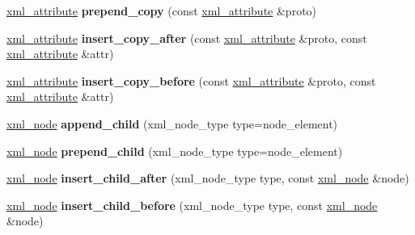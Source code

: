 \begin{DoxyCompactItemize}
\item 
\mbox{\label{classpugi_1_1xml__node_abd0f80e4d5bc938a27b50d37a0c7865b}} 
\hyperlink{classpugi_1_1xml__attribute}{xml\+\_\+attribute} {\bfseries prepend\+\_\+copy} (const \hyperlink{classpugi_1_1xml__attribute}{xml\+\_\+attribute} \&proto)
\item 
\mbox{\label{classpugi_1_1xml__node_ab5fd2ccada30141544b12c6ef554d8f4}} 
\hyperlink{classpugi_1_1xml__attribute}{xml\+\_\+attribute} {\bfseries insert\+\_\+copy\+\_\+after} (const \hyperlink{classpugi_1_1xml__attribute}{xml\+\_\+attribute} \&proto, const \hyperlink{classpugi_1_1xml__attribute}{xml\+\_\+attribute} \&attr)
\item 
\mbox{\label{classpugi_1_1xml__node_ac81f8aded4b53a9b8c98d131986cb535}} 
\hyperlink{classpugi_1_1xml__attribute}{xml\+\_\+attribute} {\bfseries insert\+\_\+copy\+\_\+before} (const \hyperlink{classpugi_1_1xml__attribute}{xml\+\_\+attribute} \&proto, const \hyperlink{classpugi_1_1xml__attribute}{xml\+\_\+attribute} \&attr)
\item 
\mbox{\label{classpugi_1_1xml__node_a190f4851bb4bc4bb61c89fffb663a9af}} 
\hyperlink{classpugi_1_1xml__node}{xml\+\_\+node} {\bfseries append\+\_\+child} (xml\+\_\+node\+\_\+type type=node\+\_\+element)
\item 
\mbox{\label{classpugi_1_1xml__node_a9e0a6dddfe1fefc74bb2b7689376989c}} 
\hyperlink{classpugi_1_1xml__node}{xml\+\_\+node} {\bfseries prepend\+\_\+child} (xml\+\_\+node\+\_\+type type=node\+\_\+element)
\item 
\mbox{\label{classpugi_1_1xml__node_a4dd8d25c02560a2692c43cc4779fb7e3}} 
\hyperlink{classpugi_1_1xml__node}{xml\+\_\+node} {\bfseries insert\+\_\+child\+\_\+after} (xml\+\_\+node\+\_\+type type, const \hyperlink{classpugi_1_1xml__node}{xml\+\_\+node} \&node)
\item 
\mbox{\label{classpugi_1_1xml__node_afe89f53c01eac8209b06f9fe7f84e7c1}} 
\hyperlink{classpugi_1_1xml__node}{xml\+\_\+node} {\bfseries insert\+\_\+child\+\_\+before} (xml\+\_\+node\+\_\+type type, const \hyperlink{classpugi_1_1xml__node}{xml\+\_\+node} \&node)

\end{DoxyCompactItemize}
